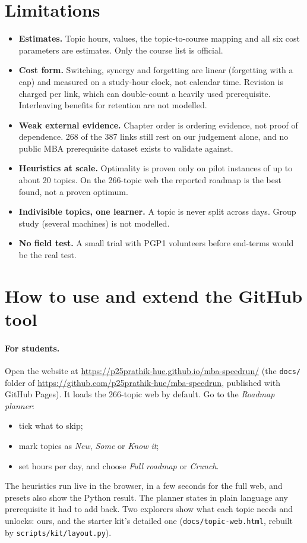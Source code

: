 \documentclass[11pt,a4paper]{article}
\newcommand{\repourl}{\url{https://github.com/p25prathik-hue/mba-speedrun}}
\newcommand{\siteurl}{\url{https://p25prathik-hue.github.io/mba-speedrun/}}
\begin{document}
\section{Limitations}
\label{sec:limits}
\begin{itemize}[leftmargin=*]
\item \textbf{Estimates.} Topic hours, values, the topic-to-course mapping and all six cost parameters are estimates. Only the course list is official.
\item \textbf{Cost form.} Switching, synergy and forgetting are linear (forgetting with a cap) and measured on a study-hour clock, not calendar time. Revision is charged per link, which can double-count a heavily used prerequisite. Interleaving benefits for retention are not modelled.
\item \textbf{Weak external evidence.} Chapter order is ordering evidence, not proof of dependence. 268 of the 387 links still rest on our judgement alone, and no public MBA prerequisite dataset exists to validate against.
\item \textbf{Heuristics at scale.} Optimality is proven only on pilot instances of up to about 20 topics. On the 266-topic web the reported roadmap is the best found, not a proven optimum.
\item \textbf{Indivisible topics, one learner.} A topic is never split across days. Group study (several machines) is not modelled.
\item \textbf{No field test.} A small trial with PGP1 volunteers before end-terms would be the real test.
\end{itemize}

\section{How to use and extend the GitHub tool}
\label{sec:github}
\paragraph{For students.} Open the website at \siteurl{} (the \texttt{docs/} folder of \repourl, published with GitHub Pages). It loads the 266-topic web by default. Go to the \emph{Roadmap planner}:
\begin{itemize}
\item tick what to skip;
\item mark topics as \emph{New}, \emph{Some} or \emph{Know it};
\item set hours per day, and choose \emph{Full roadmap} or \emph{Crunch}.
\end{itemize}
The heuristics run live in the browser, in a few seconds for the full web, and presets also show the Python result. The planner states in plain language any prerequisite it had to add back. Two explorers show what each topic needs and unlocks: ours, and the starter kit's detailed one (\texttt{docs/topic-web.html}, rebuilt by \texttt{scripts/kit/layout.py}).
\end{document}
